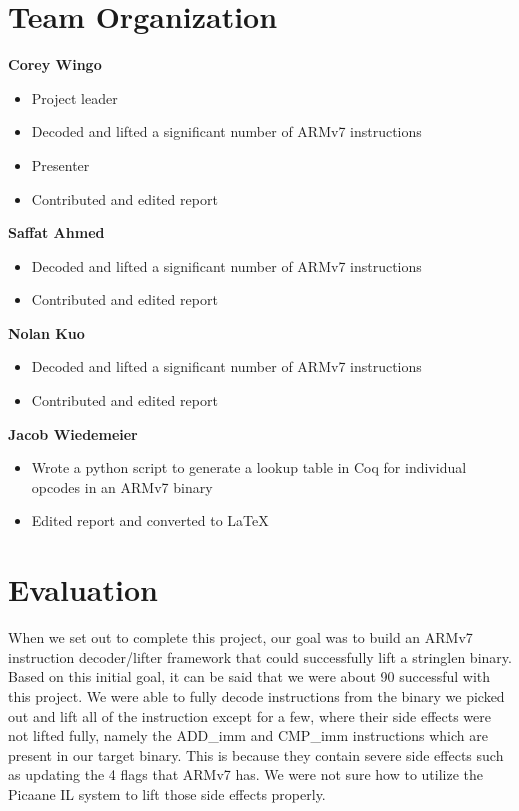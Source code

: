 \documentclass[twocolumn]{article}
\begin{document}
\newpage
\section*{\centering Team Organization}
\vspace{0.3cm}

\textbf{Corey Wingo}
\begin{itemize}
	\item Project leader
	\item Decoded and lifted a significant number of ARMv7 instructions
	\item Presenter
 \item Contributed and edited report\\
\end{itemize}


\textbf{Saffat Ahmed}
\begin{itemize}
	\item Decoded and lifted a significant number of ARMv7 instructions
  \item Contributed and edited report \\
\end{itemize}

\textbf{Nolan Kuo}
\begin{itemize}
	\item Decoded and lifted a significant number of ARMv7 instructions
  \item Contributed and edited report\\
\end{itemize}

\textbf{Jacob Wiedemeier}
\begin{itemize}
	\item Wrote a python script to generate a lookup table in Coq for individual opcodes in an ARMv7 binary
	\item Edited report and converted to LaTeX\\
\end{itemize}

\section*{\centering Evaluation}
\vspace{0.3cm}
When we set out to complete this project, our goal was to build an ARMv7 instruction decoder/lifter framework that could successfully lift a stringlen binary. Based on this initial goal, it can be said that we were about 90\text{\%} successful with this project. We were able to fully decode instructions from the binary we picked out and lift all of the instruction except for a few, where their side effects were not lifted fully, namely the ADD\_imm and CMP\_imm instructions which are present in our target binary. This is because they contain severe side effects such as updating the 4 flags that ARMv7 has. We were not sure how to utilize the Picaane IL system to lift those side effects properly. \\
\end{document}

